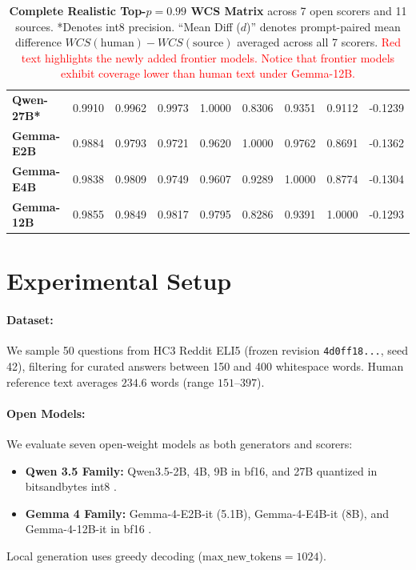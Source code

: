 \documentclass[11pt,a4paper,twocolumn]{article}
\newcommand{\diff}[1]{\textcolor{red}{#1}}
\begin{document}
\begin{table}[t]
\begin{tabular}{lcccccccc}
\textbf{Qwen-27B*} & 0.9910 & 0.9962 & 0.9973 & 1.0000 & 0.8306 & 0.9351 & 0.9112 & -0.1239 \\
\textbf{Gemma-E2B} & 0.9884 & 0.9793 & 0.9721 & 0.9620 & 1.0000 & 0.9762 & 0.8691 & -0.1362 \\
\textbf{Gemma-E4B} & 0.9838 & 0.9809 & 0.9749 & 0.9607 & 0.9289 & 1.0000 & 0.8774 & -0.1304 \\
\textbf{Gemma-12B} & 0.9855 & 0.9849 & 0.9817 & 0.9795 & 0.8286 & 0.9391 & 1.0000 & -0.1293 \\
\bottomrule
\end{tabular}
\caption{\textbf{Complete Realistic Top-$p=0.99$ WCS Matrix} across 7 open scorers and 11 sources. *Denotes int8 precision. ``Mean Diff ($d$)'' denotes prompt-paired mean difference $WCS(\text{human}) - WCS(\text{source})$ averaged across all 7 scorers. \diff{Red text highlights the newly added frontier models. Notice that frontier models exhibit coverage lower than human text under Gemma-12B.}}
\label{tab:matrix}
\end{table}

\section{Experimental Setup}

\paragraph{Dataset:} We sample 50 questions from HC3 Reddit ELI5 \cite{guo2023hc3} (frozen revision \texttt{4d0ff18...}, seed 42), filtering for curated answers between 150 and 400 whitespace words. Human reference text averages $234.6$ words (range $151$--$397$).

\paragraph{Open Models:} We evaluate seven open-weight models as both generators and scorers:
\begin{itemize}
    \item \textbf{Qwen 3.5 Family:} Qwen3.5-2B, 4B, 9B in bf16, and 27B quantized in bitsandbytes int8 \cite{qwen2026}.
    \item \textbf{Gemma 4 Family:} Gemma-4-E2B-it (5.1B), Gemma-4-E4B-it (8B), and Gemma-4-12B-it in bf16 \cite{gemma2026}.
\end{itemize}
Local generation uses greedy decoding ($\text{max\_new\_tokens}=1024$).
\end{document}
